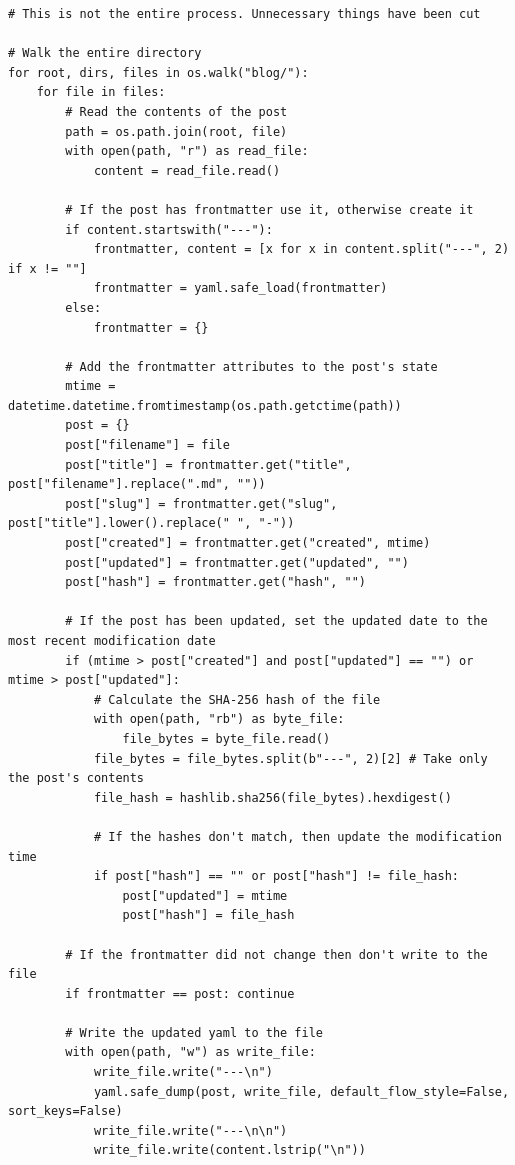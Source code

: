 \begin{verbatim}
# This is not the entire process. Unnecessary things have been cut

# Walk the entire directory
for root, dirs, files in os.walk("blog/"):
    for file in files:
        # Read the contents of the post
        path = os.path.join(root, file)
        with open(path, "r") as read_file:
            content = read_file.read()

        # If the post has frontmatter use it, otherwise create it
        if content.startswith("---"):
            frontmatter, content = [x for x in content.split("---", 2) if x != ""]
            frontmatter = yaml.safe_load(frontmatter)
        else:
            frontmatter = {}

        # Add the frontmatter attributes to the post's state
        mtime = datetime.datetime.fromtimestamp(os.path.getctime(path))
        post = {}
        post["filename"] = file
        post["title"] = frontmatter.get("title", post["filename"].replace(".md", ""))
        post["slug"] = frontmatter.get("slug", post["title"].lower().replace(" ", "-"))
        post["created"] = frontmatter.get("created", mtime)
        post["updated"] = frontmatter.get("updated", "")
        post["hash"] = frontmatter.get("hash", "")

        # If the post has been updated, set the updated date to the most recent modification date
        if (mtime > post["created"] and post["updated"] == "") or mtime > post["updated"]:
            # Calculate the SHA-256 hash of the file
            with open(path, "rb") as byte_file:
                file_bytes = byte_file.read()
            file_bytes = file_bytes.split(b"---", 2)[2] # Take only the post's contents
            file_hash = hashlib.sha256(file_bytes).hexdigest()

            # If the hashes don't match, then update the modification time
            if post["hash"] == "" or post["hash"] != file_hash:
                post["updated"] = mtime
                post["hash"] = file_hash

        # If the frontmatter did not change then don't write to the file
        if frontmatter == post: continue

        # Write the updated yaml to the file
        with open(path, "w") as write_file:
            write_file.write("---\n")
            yaml.safe_dump(post, write_file, default_flow_style=False, sort_keys=False)
            write_file.write("---\n\n")
            write_file.write(content.lstrip("\n"))
\end{verbatim}

